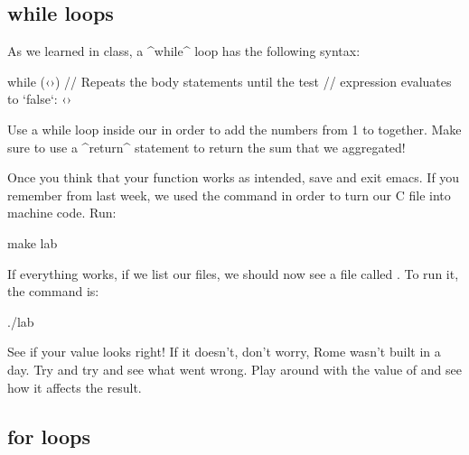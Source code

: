 \documentclass{tufte-handout}
\begin{document}
\subsection{{\codestyleKeyword while} loops} As we learned in class, a  ^while^
loop has the following syntax:

\begin{Code}
    while (‹›) {
        // Repeats the body statements until the test
        // expression evaluates to `false`:
        ‹›
    }
\end{Code}


Use a while loop inside our  in order to
add the numbers from 1 to  together. Make sure to
use a ^return^ statement to return the sum that we aggregated!

Once you think that your function works as intended, save and exit
emacs. If you remember from last week, we used the 
command in order to turn our C file into machine code. Run:

\begin{CmdLine*}
  \C make lab\\
\end{CmdLine*}

If everything works, if we list our files, we should now see a file
called . To run it, the command is:

\begin{CmdLine*}
  \C ./lab\\
\end{CmdLine*}

See if your value looks right!  If it doesn't, don't worry, Rome wasn't
built in a day.  Try and try and see what went wrong.  Play around with the value of  and see
how it affects the result.

\subsection{{\codestyleKeyword for} loops}
\end{document}

